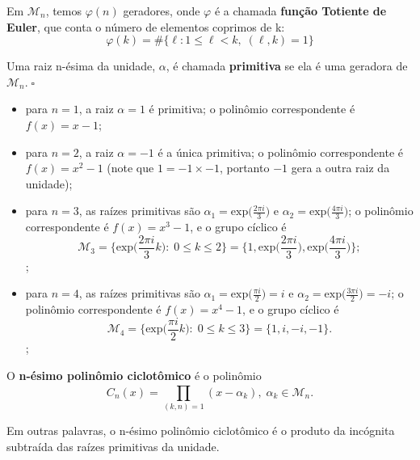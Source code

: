 \documentclass[../algebraIII_notes.tex]{subfiles}
\begin{document}
Em \(\mathcal{M}_{n}\), temos \(\varphi (n)\) geradores, onde \(\varphi \) é a chamada \textbf{função Totiente de Euler}, que conta o número de elementos coprimos de k:
\[
	\varphi (k) = \# \{\ell : 1\leq \ell < k,\; (\ell , k)=1\}
\]
\begin{def*}
	Uma raiz n-ésima da unidade, \(\alpha \), é chamada \textbf{primitiva} se ela é uma geradora de \(\mathcal{M}_{n}.\; \square\)
\end{def*}
\begin{example}
	\begin{itemize}
		\item[n=1:] para \(n=1\), a raiz \(\alpha =1\) é primitiva; o polinômio correspondente é \(f(x) = x-1\);
		\item[n=2:] para \(n=2\), a raiz \(\alpha =-1\) é a única primitiva; o polinômio correspondente é \(f(x) = x^{2}-1\) (note que \(1 = -1 \times -1\), portanto \(-1\) gera a outra raiz da unidade);
		\item[n=3:] para \(n=3\), as raízes primitivas são \(\displaystyle \alpha_1 =\mathrm{exp}\biggl(\frac{2\pi i}{3}\biggr)\) e \(\displaystyle \alpha_2 = \mathrm{exp}\biggl(\frac{4\pi i}{3}\biggr)\); o polinômio correspondente é \(f(x) = x^{3}-1\), e o grupo cíclico é
		      \[
			      \mathcal{M}_{3} = \biggl\{\mathrm{exp}\biggl(\frac{2\pi i}{3}k\biggr):\; 0\leq k \leq 2\biggr\} = \biggl\{1, \mathrm{exp}\biggl(\frac{2\pi i}{3}\biggr), \mathrm{exp}\biggl(\frac{4\pi i}{3}\biggr)\biggr\};
		      \];
		\item[n=4:] para \(n=4\), as raízes primitivas são \(\displaystyle \alpha_1 =\mathrm{exp}\biggl(\frac{\pi i}{2}\biggr)=i\) e \(\displaystyle \alpha_2 = \mathrm{exp}\biggl(\frac{3\pi i}{2}\biggr)=-i\); o polinômio correspondente é \(f(x) = x^{4}-1\), e o grupo cíclico é
		      \[
			      \mathcal{M}_{4} = \biggl\{\mathrm{exp}\biggl(\frac{\pi i}{2}k\biggr):\; 0\leq k \leq 3\biggr\} = \{1, i, -i, -1\}.
		      \];
	\end{itemize}
\end{example}
\begin{def*}
	O \textbf{n-ésimo polinômio ciclotômico} é o polinômio
	\[
		C_{n}(x) = \prod\limits_{(k, n)=1}^{}(x-\alpha_{k}),\; \alpha_{k}\in \mathcal{M}_{n}.
	\]
\end{def*}
Em outras palavras, o n-ésimo polinômio ciclotômico é o produto da incógnita subtraída das raízes primitivas da unidade.
\end{document}
